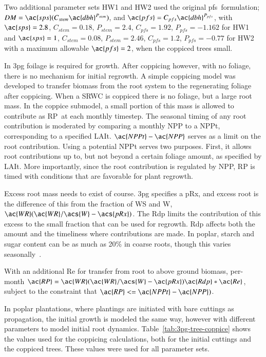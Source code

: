 \documentclass[preprint,12pt]{elsarticle}
\begin{document}
Two additional parameter sets HW1 and HW2 used the original
\ac{pfs}~formulation; $DM=\ac{sps}(C_{stem} \ac{dbh}^{P_{stem}})$, and $\ac{pfs} =
C_{pfs} \ac{dbh}^{P_{pfs}}$, with $\ac{sps}=2.8$, $C_{stem}=0.18$,
$P_{stem}=2.4$, $C_{pfs}=1.92$, $P_{pfs}=-1.162$ for HW1 and $\ac{sps}=1$,
$C_{stem}=0.08$, $P_{stem}=2.46$, $C_{pfs}=1.2$, $P_{pfs}=-0.77$ for
HW2 with a maximum allowable $\ac{pfs}=2$, when the coppiced trees small.

In \ac{3pg} foilage is required for growth.  After coppicing however,
with no foliage, there is no mechanism for initial regrowth. A simple
coppicing model was developed to transfer biomass from the root system
to the regenerating foliage after coppicing.  When a \ac{SRWC} is
coppiced there is no foliage, but a large root mass.  In the coppice
submodel, a small portion of this mass is allowed to contribute as
\ac{RP}~at each monthly timestep.  The seasonal timing of any root
contribution is moderated by comparing a monthly \ac{NPP} to a
\ac{NPPt}, corresponding to a specified
\ac{LAIt}. $\ac{NPPt}-\ac{NPP}$ serves as a limit on the root
contribution.  Using a potential \ac{NPPt} serves two purposes. First,
it allows root contributions up to, but not beyond a certain foliage
amount, as specified by \ac{LAIt}.  More importantly, since the root
contribution is regulated by \ac{NPP}, \ac{RP} is timed with
conditions that are favorable for plant regrowth.

Excess root mass needs to exist of course.  \ac{3pg} specifies a
\ac{pRx}, and excess root is the difference of this from the fraction
of \ac{WS} and \ac{W}, $\ac{WR}(\ac{WR}/\acs{W}-\acs{pRx})$.  The
\ac{Rdp} limits the contribution of this excess to the small fraction
that can be used for regrowth. \ac{Rdp} affects both the amount and
the timeliness where contributions are made.  In poplar, starch and
sugar content can be as much as 20\% in coarse roots, though this
varies seasonally~\cite{Regier2010}.

With an additional \ac{Re} for transfer from root to above ground
biomass, per-month $\ac{RP} =
\ac{WR}(\ac{WR}/\acs{W}-\ac{pRx})\ac{Rdp}*\ac{Re}$, subject to the
constraint that $\ac{RP} <= \ac{NPPt}-\ac{NPP})$.

In poplar plantations, where plantings are initiated with bare
cuttings as propagation, the initial growth is modeled the same way,
however with different parameters to model initial root dynamics.
Table~\ref{tab:3pg-tree-coppice} shows the values used for the
coppicing calculations, both for the initial cuttings and the coppiced
trees.  These values were used for all parameter sets.
\end{document}
